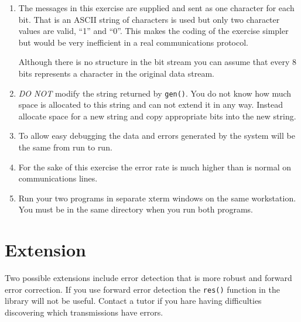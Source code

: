 \documentclass[a4paper,10pt]{article}
\begin{document}
\begin{enumerate}
\item
The messages in this exercise are supplied and sent as one character
for each bit.  That is an ASCII string of characters is used but only
two character values are valid, ``1'' and ``0''.  This makes the
coding of the exercise simpler but would be very inefficient in a
real communications protocol.

Although there is no structure in the bit stream you can assume that
every 8 bits represents a character in the original data stream.

\item \vspace{3mm}

{\em DO NOT} modify the string returned by \verb+gen()+.  You do not
know how much space is allocated to this string and can not extend it
in any way.  Instead allocate space for a new string and copy
appropriate bits into the new string.

\item
To allow easy debugging the data and errors generated by the system
will be the same from run to run. 

\item
For the sake of this exercise the error rate is much higher than is
normal on communications lines.

\item
Run your two programs in separate xterm windows on the same
workstation.  You must be in the same directory when you run both
programs.
\end{enumerate}

\section{Extension}

Two possible extensions include error detection that is more robust
and forward error correction.  If you use forward error detection the
\verb+res()+ function in the library will not be useful.  Contact a
tutor if you hare having difficulties discovering which transmissions
have errors.

\thispagestyle{rcsfooters}
\pagestyle{rcsfooters}
\end{document}
